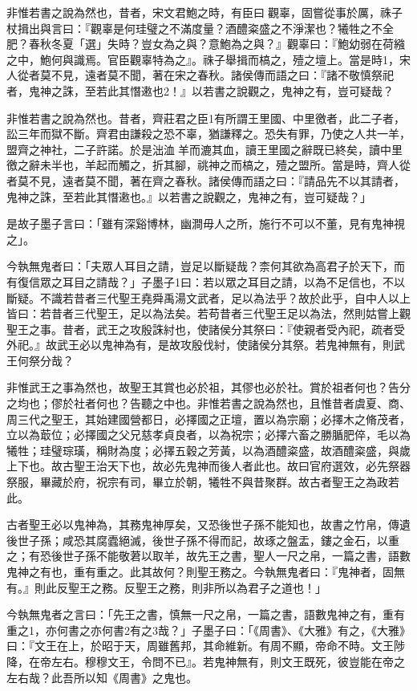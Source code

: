 \begin{pinyinscope}
非惟若書之說為然也，昔者，宋文君鮑之時，有臣曰𥙐觀辜，固嘗從事於厲，祩子杖揖出與言曰：『觀辜是何珪璧之不滿度量？酒醴粢盛之不淨潔也？犧牲之不全肥？春秋冬夏「選」失時？豈女為之與？意鮑為之與？』觀辜曰：『鮑幼弱在荷繈之中，鮑何與識焉。官臣觀辜特為之』。祩子舉揖而槁之，殪之壇上。當是時1，宋人從者莫不見，遠者莫不聞，著在宋之春秋。諸侯傳而語之曰：『諸不敬慎祭祀者，鬼神之誅，至若此其憯遫也2！』以若書之說觀之，鬼神之有，豈可疑哉？

非惟若書之說為然也。昔者，齊莊君之臣1有所謂王里國、中里徼者，此二子者，訟三年而獄不斷。齊君由謙殺之恐不辜，猶謙釋之。恐失有罪，乃使之人共一羊，盟齊之神社，二子許諾。於是泏洫𢵣羊而漉其血，讀王里國之辭既已終矣，讀中里徼之辭未半也，羊起而觸之，折其腳，祧神之而槁之，殪之盟所。當是時，齊人從者莫不見，遠者莫不聞，著在齊之春秋。諸侯傳而語之曰：『請品先不以其請者，鬼神之誅，至若此其憯遫也。』以若書之說觀之，鬼神之有，豈可疑哉？」

是故子墨子言曰：「雖有深谿博林，幽澗毋人之所，施行不可以不董，見有鬼神視之」。

今執無鬼者曰：「夫眾人耳目之請，豈足以斷疑哉？柰何其欲為高君子於天下，而有復信眾之耳目之請哉？」子墨子1曰：若以眾之耳目之請，以為不足信也，不以斷疑。不識若昔者三代聖王堯舜禹湯文武者，足以為法乎？故於此乎，自中人以上皆曰：若昔者三代聖王，足以為法矣。若苟昔者三代聖王足以為法，然則姑嘗上觀聖王之事。昔者，武王之攻殷誅紂也，使諸侯分其祭曰：『使親者受內祀，疏者受外祀。』故武王必以鬼神為有，是故攻殷伐紂，使諸侯分其祭。若鬼神無有，則武王何祭分哉？

非惟武王之事為然也，故聖王其賞也必於祖，其僇也必於社。賞於祖者何也？告分之均也；僇於社者何也？告聽之中也。非惟若書之說為然也，且惟昔者虞夏、商、周三代之聖王，其始建國營都日，必擇國之正壇，置以為宗廟；必擇木之脩茂者，立以為菆位；必擇國之父兄慈孝貞良者，以為祝宗；必擇六畜之勝腯肥倅，毛以為犧牲；珪璧琮璜，稱財為度；必擇五穀之芳黃，以為酒醴粢盛，故酒醴粢盛，與歲上下也。故古聖王治天下也，故必先鬼神而後人者此也。故曰官府選效，必先祭器祭服，畢藏於府，祝宗有司，畢立於朝，犧牲不與昔聚群。故古者聖王之為政若此。

古者聖王必以鬼神為，其務鬼神厚矣，又恐後世子孫不能知也，故書之竹帛，傳遺後世子孫；咸恐其腐蠹絕滅，後世子孫不得而記，故琢之盤盂，鏤之金石，以重之；有恐後世子孫不能敬莙以取羊，故先王之書，聖人一尺之帛，一篇之書，語數鬼神之有也，重有重之。此其故何？則聖王務之。今執無鬼者曰：『鬼神者，固無有。』則此反聖王之務。反聖王之務，則非所以為君子之道也！」

今執無鬼者之言曰：「先王之書，慎無一尺之帛，一篇之書，語數鬼神之有，重有重之1，亦何書之亦何書2有之3哉？」子墨子曰：「《周書》、《大雅》有之，《大雅》曰：『文王在上，於昭于天，周雖舊邦，其命維新。有周不顯，帝命不時。文王陟降，在帝左右。穆穆文王，令問不已』。若鬼神無有，則文王既死，彼豈能在帝之左右哉？此吾所以知《周書》之鬼也。


\end{pinyinscope}
